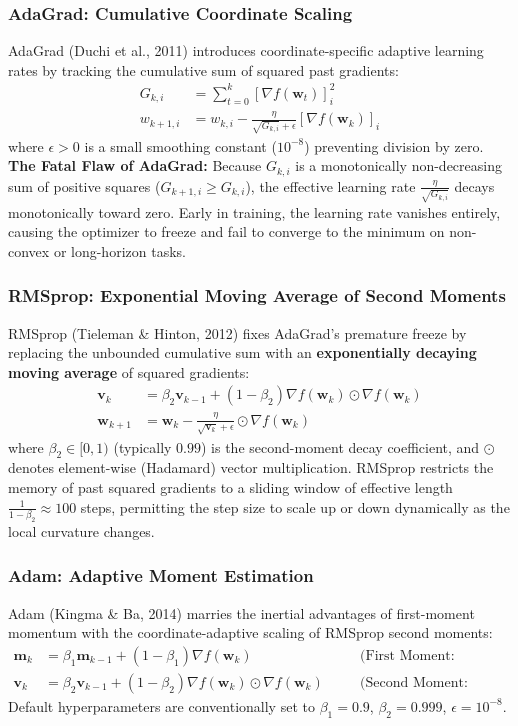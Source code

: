 \subsubsection{AdaGrad: Cumulative Coordinate Scaling}
AdaGrad (Duchi et al., 2011) introduces coordinate-specific adaptive learning rates by tracking the cumulative sum of squared past gradients:
\begin{align}
G_{k, i} &= \sum_{t=0}^k [\nabla f(\mathbf{w}_t)]_i^2 \\
w_{k+1, i} &= w_{k, i} - \frac{\eta}{\sqrt{G_{k, i}} + \epsilon} [\nabla f(\mathbf{w}_k)]_i
\end{align}
where $\epsilon > 0$ is a small smoothing constant ($10^{-8}$) preventing division by zero.
\textbf{The Fatal Flaw of AdaGrad:} Because $G_{k, i}$ is a monotonically non-decreasing sum of positive squares ($G_{k+1, i} \ge G_{k, i}$), the effective learning rate $\frac{\eta}{\sqrt{G_{k, i}}}$ decays monotonically toward zero. Early in training, the learning rate vanishes entirely, causing the optimizer to freeze and fail to converge to the minimum on non-convex or long-horizon tasks.

\subsubsection{RMSprop: Exponential Moving Average of Second Moments}
RMSprop (Tieleman \& Hinton, 2012) fixes AdaGrad's premature freeze by replacing the unbounded cumulative sum with an \textbf{exponentially decaying moving average} of squared gradients:
\begin{align}
\mathbf{v}_k &= \beta_2 \mathbf{v}_{k-1} + (1 - \beta_2) \nabla f(\mathbf{w}_k) \odot \nabla f(\mathbf{w}_k) \\
\mathbf{w}_{k+1} &= \mathbf{w}_k - \frac{\eta}{\sqrt{\mathbf{v}_k} + \epsilon} \odot \nabla f(\mathbf{w}_k)
\end{align}
where $\beta_2 \in [0, 1)$ (typically $0.99$) is the second-moment decay coefficient, and $\odot$ denotes element-wise (Hadamard) vector multiplication. RMSprop restricts the memory of past squared gradients to a sliding window of effective length $\frac{1}{1 - \beta_2} \approx 100$ steps, permitting the step size to scale up or down dynamically as the local curvature changes.

\subsubsection{Adam: Adaptive Moment Estimation}
Adam (Kingma \& Ba, 2014) marries the inertial advantages of first-moment momentum with the coordinate-adaptive scaling of RMSprop second moments:
\begin{align}
\mathbf{m}_k &= \beta_1 \mathbf{m}_{k-1} + (1 - \beta_1) \nabla f(\mathbf{w}_k) \quad &&\text{(First Moment: Velocity)} \label{eq:adam_m} \\
\mathbf{v}_k &= \beta_2 \mathbf{v}_{k-1} + (1 - \beta_2) \nabla f(\mathbf{w}_k) \odot \nabla f(\mathbf{w}_k) \quad &&\text{(Second Moment: Variance)} \label{eq:adam_v}
\end{align}
Default hyperparameters are conventionally set to $\beta_1 = 0.9$, $\beta_2 = 0.999$, $\epsilon = 10^{-8}$.

